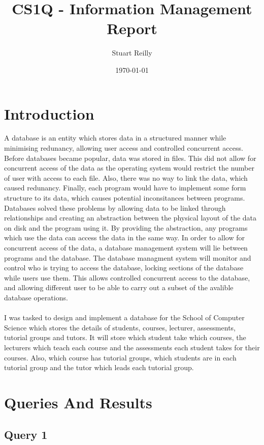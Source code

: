 \documentclass[12pt]{article}
\author{Stuart Reilly}
\date{\today}
\title{CS1Q - Information Management Report}
\begin{document}
\maketitle

\newpage
\tableofcontents

\newpage

\section{Introduction}
A database is an entity which stores data in a structured manner while minimising redunancy, allowing user access and controlled concurrent access.
Before databases became popular, data was stored in files.
This did not allow for concurrent access of the data as the operating system would restrict the number of user with access to each file.
Also, there was no way to link the data, which caused redunancy.
Finally, each program would have to implement some form structure to its data, which causes potential inconsitances between programs.
Databases solved these problems by allowing data to be linked through relationships and creating an abstraction between the physical layout of the data on disk and the program using it.
By providing the abstraction, any programs which use the data can access the data in the same way.
In order to allow for concurrent access of the data, a database management system will lie between programs and the database.
The database managment system will monitor and control who is trying to access the database, locking sections of the database while users use them.
This allows controlled concurrent access to the database, and allowing different user to be able to carry out a subset of the avalible database operations.
\\
\\
I was tasked to design and implement a database for the School of Computer Science which stores the details of students, courses, lecturer, assessments, tutorial groups and tutors.
It will store which student take which courses, the lecturers which teach each course and the assessments each student takes for their courses.
Also, which course has tutorial groups, which students are in each tutorial group and the tutor which leads each tutorial group.

\section{Queries And Results}
\subsection{Query 1}
\end{document}
